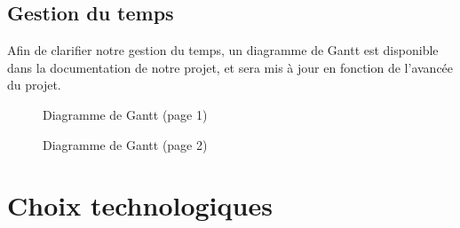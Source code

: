 \documentclass[a4paper]{article}
\newcommand{\alinea}{\hspace*{0.5cm}}
\begin{document}
      \subsection{Gestion du temps}
        \label{GestionTps}
        \alinea Afin de clarifier notre gestion du temps, un diagramme de Gantt est disponible dans la documentation de notre projet, et sera mis à jour en fonction de l'avancée du projet.\\
		\newpage
        \begin{figure}
          \begin{center}
          \end{center}
          \label{DiagGantt}
          \caption{Diagramme de Gantt (page 1)}
        \end{figure}
		\newpage
        \begin{figure}
          \begin{center}
          \end{center}
          \caption{Diagramme de Gantt (page 2)}
        \end{figure}

    \section{Choix technologiques}
\end{document}
